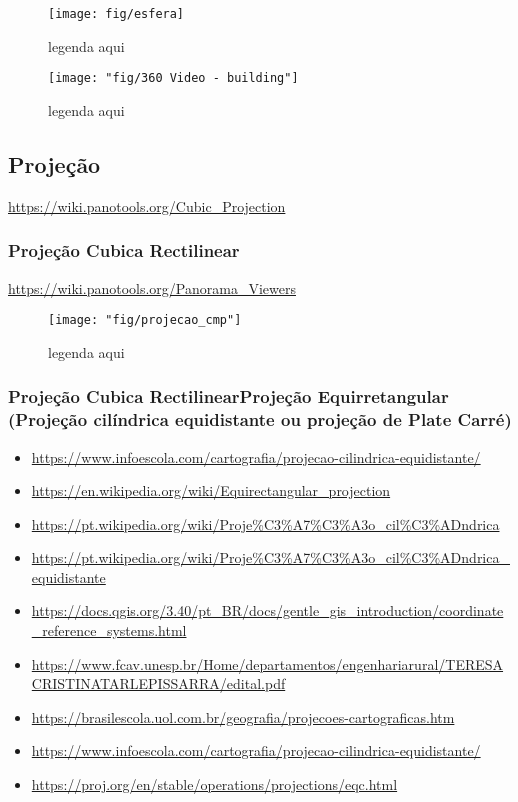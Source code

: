 \begin{figure}[tbh]
	\centering
	\texttt{[image: fig/esfera]}
	\caption{legenda aqui}
	\label{fig:esfera}
\end{figure}


\begin{figure}[tbh]
	\centering
	\texttt{[image: "fig/360 Video - building"]}
	\caption{legenda aqui}
	\label{fig:building_360_video}
\end{figure}






\subsection{Projeção}
\href{https://wiki.panotools.org/Cubic_Projection}{https://wiki.panotools.org/Cubic\_Projection}

\subsubsection{Projeção Cubica Rectilinear}
\href{https://wiki.panotools.org/Panorama_Viewers}{https://wiki.panotools.org/Panorama\_Viewers}

\begin{figure}[tbh]
	\centering
	\texttt{[image: "fig/projecao\_cmp"]}
	\caption{legenda aqui}
	\label{fig:projecao_cmp}
\end{figure}

\subsubsection{Projeção Cubica RectilinearProjeção Equirretangular (Projeção cilíndrica equidistante ou projeção de Plate Carré)}

\begin{itemize}
	\item \url{https://www.infoescola.com/cartografia/projecao-cilindrica-equidistante/}
	\item \url{https://en.wikipedia.org/wiki/Equirectangular_projection}
	\item \url{https://pt.wikipedia.org/wiki/Proje%C3%A7%C3%A3o_cil%C3%ADndrica}
	\item \url{https://pt.wikipedia.org/wiki/Proje%C3%A7%C3%A3o_cil%C3%ADndrica_equidistante}
	\item \url{https://docs.qgis.org/3.40/pt_BR/docs/gentle_gis_introduction/coordinate_reference_systems.html}
	\item \url{https://www.fcav.unesp.br/Home/departamentos/engenhariarural/TERESACRISTINATARLEPISSARRA/edital.pdf}
	\item \url{https://brasilescola.uol.com.br/geografia/projecoes-cartograficas.htm}
	\item \url{https://www.infoescola.com/cartografia/projecao-cilindrica-equidistante/}
	\item \url{https://proj.org/en/stable/operations/projections/eqc.html}	
\end{itemize}

